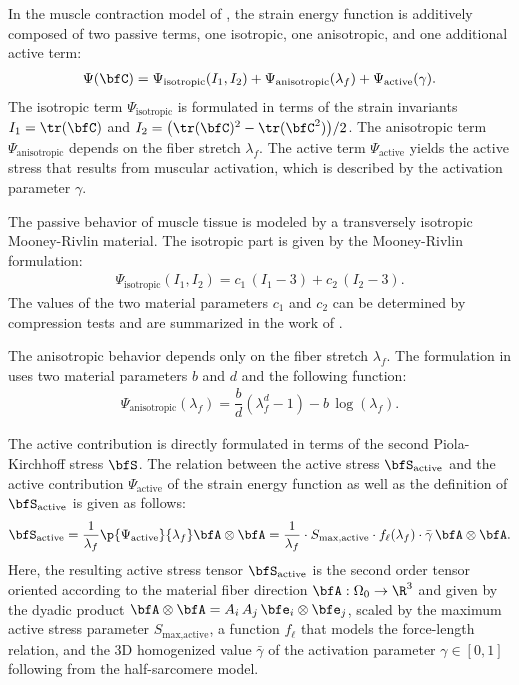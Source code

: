 In the muscle contraction model of \cite{Heidlauf2013}, the strain energy function is additively composed of two passive terms, one isotropic, one anisotropic, and one additional active term:
\begin{align}\label{eq:transiso_mooney_rivlin}
  \Psi(\bfC) = \Psi_\text{isotropic}(I_1,I_2) + \Psi_\text{anisotropic}(\lambda_f) + \Psi_\text{active}(\gamma).
\end{align}
The isotropic term $\Psi_\text{isotropic}$ is formulated in terms of the strain invariants $I_1=\tr(\bfC)$ and $I_2=\big(\tr(\bfC)^2 - \tr(\bfC^2)\big)/2$. The anisotropic term $\Psi_\text{anisotropic}$ depends on the fiber stretch $\lambda_f$. The active term $\Psi_\text{active}$ yields the active stress that results from muscular activation, which is described by the activation parameter $\gamma$.

The passive behavior of muscle tissue is modeled by a transversely isotropic Mooney-Rivlin material.
The isotropic part is given by the Mooney-Rivlin formulation:%
\begin{align}\label{eq:mooney_rivlin}
  \Psi_\text{isotropic}(I_1,I_2) = c_1\,(I_1 - 3) + c_2\,(I_2-3).
\end{align}
The values of the two material parameters $c_1$ and $c_2$ can be determined by compression tests and are summarized in the work of \cite{Heidlauf2013}.

The anisotropic behavior depends only on the fiber stretch $\lambda_f$. The formulation in \cite{Heidlauf2013} uses two material parameters $b$ and $d$ and the following function:
\begin{align*}
  \Psi_\text{anisotropic}(\lambda_f) = \dfrac{b}{d}(\lambda_f^d - 1) - b\,\log(\lambda_f).
\end{align*}
%

The active contribution is directly formulated in terms of the second Piola-Kirchhoff stress $\bfS$. The relation between the active stress $\bfS_\text{active}$ and the active contribution $\Psi_\text{active}$ of the strain energy function as well as the definition of $\bfS_\text{active}$ is given as follows:
\begin{align}\label{eq:active_stress_term}
  \bfS_\text{active} = \dfrac{1}{\lambda_f}\p{\Psi_\text{active}}{\lambda_f} \bfA \otimes \bfA = \dfrac{1}{\lambda_f} \cdot S_\text{max,active}\cdot f_\ell(\lambda_f)\cdot\bar{\gamma}\, \bfA \otimes \bfA.
\end{align}
%
Here, the resulting active stress tensor $\bfS_\text{active}$ is the second order tensor oriented according to the material fiber direction $\bfA: \Omega_0 \to \R^3$ and given by the dyadic product $\bfA \otimes \bfA = A_{i}\,A_{j}\,\bfe_i \otimes \bfe_j$, scaled by the maximum active stress parameter $S_\text{max,active}$, a function $f_\ell$ that models the force-length relation, and the 3D homogenized value $\bar{\gamma}$ of the activation parameter $\gamma \in [0,1]$ following from the half-sarcomere model.

